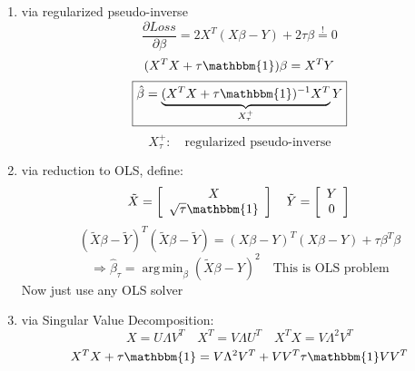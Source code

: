 \documentclass[11pt]{article}
\DeclareMathOperator*{\argmin}{arg\,min}
\begin{document}
    \begin{enumerate}
      \item via regularized pseudo-inverse
      \begin{equation*}
        \frac{\partial Loss}{\partial \beta}=2X^T(X\beta-Y)+2\tau\beta\overset{!}{=}0
      \end{equation*}
      \begin{equation*}
        (X^TX+\tau\mathbbm{1})\beta=X^TY
      \end{equation*}
      \begin{equation*}
        \boxed{\hat{\beta}=\underbrace{(X^TX+\tau\mathbbm{1})^{-1}X^T}_{X_\tau^+}Y}
      \end{equation*}
      \begin{equation*}
        X_\tau^+: \quad \text{regularized pseudo-inverse}
      \end{equation*}
      \item via reduction to OLS, define:
      \begin{equation*}
        \tilde{X} = \left[
          \begin{array}{c}
            X \\
            \sqrt{\tau}\mathbbm{1}
          \end{array}
        \right]
        \quad
        \tilde{Y} = \left[
          \begin{array}{c}
            Y \\
            0
          \end{array}
        \right]
      \end{equation*}
      \begin{equation*}
        (\tilde{X}\beta-\tilde{Y})^T(\tilde{X}\beta-\tilde{Y}) =
        (X\beta-Y)^T(X\beta-Y)+\tau \beta^T\beta
      \end{equation*}
      \begin{equation*}
        \Rightarrow \hat{\beta}_\tau= \argmin_\beta (\tilde{X}\beta-Y)^2 \quad
        \text{This is OLS problem}
      \end{equation*}
      Now just use any OLS solver
      \item via Singular Value Decomposition:
      \begin{equation*}
        X=U\Lambda V^T\quad X^T=V \Lambda U^T \quad X^TX=V\Lambda^2 V^T
      \end{equation*}
      \begin{equation*}
        \begin{align*}
        X^TX+\tau\mathbbm{1}&=V\Lambda^2V^T+VV^T\tau\mathbbm{1}VV^T \\

\end{align*}
\end{equation*}
\end{enumerate}
\end{document}
